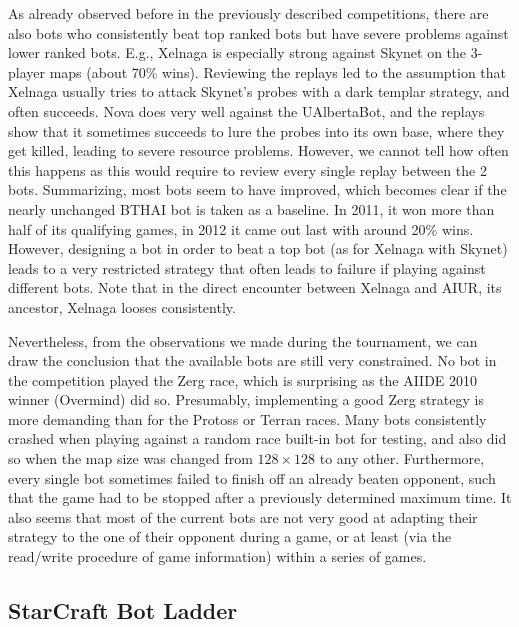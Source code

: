 \documentclass[journal]{IEEEtran}
\begin{document}
As already observed before in the previously described competitions,
there are also bots who consistently beat top ranked bots but have
severe problems against lower ranked bots. E.g., Xelnaga is especially
strong against Skynet on the 3-player maps (about 70\% wins). Reviewing
the replays led to the assumption that Xelnaga usually tries to attack
Skynet's probes with a dark templar strategy, and often succeeds. 
Nova does very well against the UAlbertaBot, and the replays show
that it sometimes succeeds to lure the probes into its own base, where
they get killed, leading to severe resource problems. However, we cannot
tell how often this happens as this would require to review every single
replay between the 2 bots. Summarizing, most bots seem to have improved,
which becomes clear if the nearly unchanged BTHAI bot is taken as a baseline.
In 2011, it won more than half of its qualifying games, in 2012 it came
out last with around 20\% wins. However, designing a bot in order to 
beat a top bot (as for Xelnaga with Skynet) leads to a very restricted
strategy that often leads to failure if playing against different bots.
Note that in the direct encounter between Xelnaga and AIUR, its ancestor,
Xelnaga looses consistently.

Nevertheless, from the observations we made during the tournament,
we can draw the conclusion that the available bots are still 
very constrained. No bot in the competition played the Zerg race,
which is surprising as the AIIDE 2010 winner (Overmind) did so.
Presumably, implementing a good Zerg strategy is more demanding
than for the Protoss or Terran races. Many bots consistently crashed
when playing against a random race built-in bot for testing, and
also did so when the map size was changed from $128\times 128$ to 
any other. Furthermore, every single bot sometimes failed to finish
off an already beaten opponent, such that the game had to be stopped
after a previously determined maximum time. It also seems that most of
the current bots are not very good at adapting their strategy to the
one of their opponent during a game, or at least (via the read/write
procedure of game information) within a series of games.



\subsection{StarCraft Bot Ladder}\label{sec:ladder}
\end{document}
